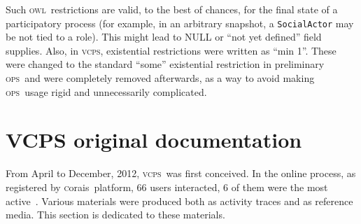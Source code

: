 \documentclass[10pt,letterpaper]{article}
\newcommand{\ops}{\textsc{ops}}
\newcommand{\vcps}{\textsc{vcps}}
\newcommand{\owl}{\textsc{owl}}
\newcommand{\skos}{\textsc{skos}}
\newcommand{\obs}{\textsc{obs}}
\newcommand{\vbs}{\textsc{vbs}}
\newcommand{\corais}{\textsc{c}orais}
\begin{document}
Such \owl\ restrictions are valid, to the best of chances,
for the final state of a participatory process 
(for example, in an arbitrary snapshot, a \texttt{SocialActor} may be not tied to a role).
This might lead to NULL or ``not yet defined'' field supplies.
Also, in \vcps, existential restrictions were written as ``min 1''. 
These were changed to the standard ``some'' existential restriction in preliminary \ops\
and were completely removed afterwards, as a way to avoid making \ops\ usage rigid and unnecessarily complicated.

%

\section{VCPS original documentation}\label{sec:orig}
From April to December, 2012, \vcps\ was first conceived.
In the online process, as registered by \corais\ platform, 66 users interacted,
6 of them were the most active~\cite{metodologia}.
Various materials were produced both as activity traces and as reference media.
This section is dedicated to these materials.
\end{document}
